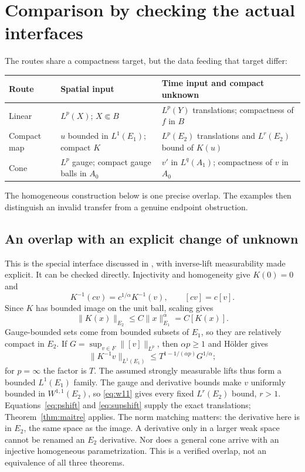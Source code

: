 \documentclass[12pt,reqno]{amsart}
\begin{document}
\section{Comparison by checking the actual interfaces}
The routes share a compactness target, but the data feeding that target differ:
\begin{center}
\begin{tabular}{p{}p{}p{}}
Route & Spatial input & Time input and compact unknown \\\hline
Linear & $L^p(X)$; $X\Subset B$ & $L^p(Y)$ translations; compactness of $f$ in $B$ \\
Compact map & $u$ bounded in $L^1(E_1)$; compact $K$ & $L^p(E_2)$ translations and $L^r(E_2)$ bound of $K(u)$ \\
Cone & $L^p$ gauge; compact gauge balls in $A_0$ & $v'$ in $L^q(A_1)$; compactness of $v$ in $A_0$
\end{tabular}
\end{center}
The homogeneous construction below is one precise overlap. The examples then distinguish an invalid transfer from a genuine endpoint obstruction.
\subsection{An overlap with an explicit change of unknown}
\begin{proposition}\label{prop:overlap}

\end{proposition}
This is the special interface discussed in \cite[Section 4, pp.~15--16]{S-barrett-suli}, with inverse-lift measurability made explicit. It can be checked directly.
Injectivity and homogeneity give $K(0)=0$ and
\[
K^{-1}(cv)=c^{1/\alpha}K^{-1}(v),\qquad [cv]=c[v].
\]
Since $K$ has bounded image on the unit ball, scaling gives
\[
\|K(x)\|_{E_2}\le C\|x\|_{E_1}^{\alpha}=C[K(x)].
\]
Gauge-bounded sets come from bounded subsets of $E_1$, so they are relatively compact in $E_2$.
If $G=\sup_{v\in F}\|[v]\|_{L^p}$, then $\alpha p\ge1$ and H\"older gives
\begin{equation}\label{eq:lift}
\|K^{-1}v\|_{L^1(E_1)}
\le T^{1-1/(\alpha p)}G^{1/\alpha};
\end{equation}
for $p=\infty$ the factor is $T$. The assumed strongly measurable lifts thus form a bounded $L^1(E_1)$ family. The gauge and derivative bounds make $v$ uniformly bounded in $W^{1,1}(E_2)$, so \eqref{eq:w11} gives every fixed $L^r(E_2)$ bound, $r>1$. Equations~\eqref{eq:pshift} and \eqref{eq:supshift} supply the exact translations; Theorem~\ref{thm:maitre} applies.
The norm matching matters: the derivative here is in $E_2$, the same space as the image. A derivative only in a larger weak space cannot be renamed an $E_2$ derivative. Nor does a general cone arrive with an injective homogeneous parametrization. This is a verified overlap, not an equivalence of all three theorems.
\end{document}
